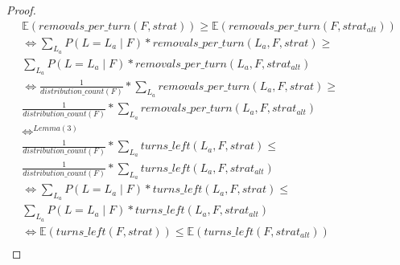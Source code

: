 \documentclass[a4paper,12pt]{llncs}
\numberwithin{equation}{section}
\begin{document}
\begin{proof}
\begin{align}
\mathds{E}(removals\_per\_turn(F, strat)) \geq \mathds{E}(removals\_per\_turn(F, strat_{alt})) \\
\Leftrightarrow
\sum_{L_a}{P(L = L_a \mid F) * removals\_per\_turn(L_a, F, strat)} \geq \\
\sum_{L_a}{P(L = L_a \mid F) * removals\_per\_turn(L_a, F, strat_{alt})} \\
\Leftrightarrow
\frac{1}{distribution\_count(F)} * \sum_{L_a}{removals\_per\_turn(L_a, F, strat)} \geq \\
\frac{1}{distribution\_count(F)} * \sum_{L_a}{removals\_per\_turn(L_a, F, strat_{alt})} \\
\Leftrightarrow^{Lemma (3)} \\
\frac{1}{distribution\_count(F)} * \sum_{L_a}{turns\_left(L_a, F, strat)} \leq \\
\frac{1}{distribution\_count(F)} * \sum_{L_a}{turns\_left(L_a, F, strat_{alt})} \\
\Leftrightarrow
\sum_{L_a}{P(L = L_a \mid F) * turns\_left(L_a, F, strat)} \leq \\
\sum_{L_a}{P(L = L_a \mid F) * turns\_left(L_a, F, strat_{alt})} \\
\Leftrightarrow
\mathds{E}(turns\_left(F, strat)) \leq \mathds{E}(turns\_left(F, strat_{alt})) \\
\end{align}
\end{proof}

\newpage

 

\end{document}
